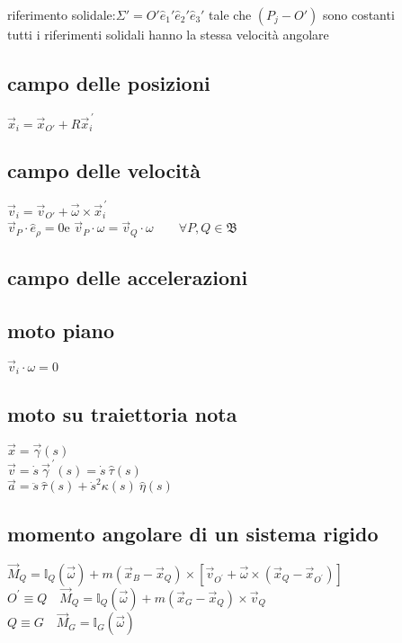\documentclass[10pt,a4paper,landscape]{article}
\begin{document}
\begin{multicols}{3}
riferimento solidale:\quad$\Sigma'=O'\hat e_1' \hat e_2' \hat e_3'$ tale che $(P_j-O')$ sono costanti\\
tutti i riferimenti solidali hanno la stessa velocità angolare\\

	\subsection{campo delle posizioni}
	$\vec x_i=\vec x_{O'}+R\vec x_i^{\,\prime}$\\

	\subsection{campo delle velocità}
	$\vec v_i=\vec v_{O'}+\vec\omega\times\vec x_i^{\,\prime}$\\
	$\vec v_P\cdot\hat e_\rho=0$\quad e \quad$\vec v_P\cdot\omega=\vec v_Q\cdot\omega\qquad\forall P,Q\in\mathfrak{B}$\\
	
	\subsection{campo delle accelerazioni}

	\subsection{moto piano}
	$\vec v_i\cdot\omega=0$\\

	\subsection{moto su traiettoria nota}
	$\vec x=\vec\gamma (s)$\\
	$\vec v=\dot s\:\vec\gamma^{\,\prime}(s)=\dot s\:\hat\tau(s)$\\
	$\vec a=\ddot s\:\hat\tau(s)+\dot s^2\kappa(s)\:\hat\eta(s)$\\

	\subsection{momento angolare di un sistema rigido}
	$\vec M_Q=\mathbb{I}_Q(\vec \omega)+m(\vec x_B-\vec x_Q)\times[\vec v_{O^\prime}+\vec \omega \times (\vec x_Q-\vec x_{O^\prime})]$\\
	$O^{\prime}\!\equiv\!Q\quad\vec M_Q=\mathbb{I}_Q(\vec \omega)+m(\vec x_G-\vec x_Q)\times \vec v_Q$\\
	$Q\equiv\!G\quad\vec M_G=\mathbb{I}_G(\vec \omega)$\\


\end{multicols}
\end{document}
